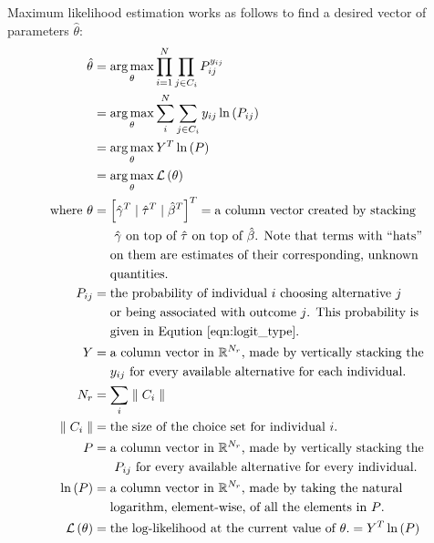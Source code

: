 \documentclass{article}
\DeclareMathOperator*{\argmax}{arg\,max} %
\begin{document}
Maximum likelihood estimation works as follows to find a desired vector of parameters $\hat{\theta}$:
\begin{equation}
\label{eqn:log_likelihood}
\begin{aligned}
\hat{\theta} &= \argmax_{\theta} \prod _{i = 1} ^N \prod _{j \in C_i} P_{ij} ^{y_{ij}} \\
&= \argmax_{\theta} \sum _i ^N \sum _{j \in C_i} y_{ij} \ln \left( P_{ij} \right) \\
&= \argmax_{\theta} Y^T \ln \left( P \right) \\
&= \argmax_{\theta} \mathcal{L} \left( \theta \right) \\
\textrm{where } \theta &= \left[ \hat{\gamma} ^T \mid \hat{\tau} ^T \mid \hat{\beta} ^T \right]^T = \textrm{a column vector created by stacking}\\
&\quad \ \textrm{ $\hat{\gamma}$ on top of $\hat{\tau}$ on top of $\hat{\beta}$. Note that terms with ``hats''} \\
&\quad \ \textrm{on them are estimates of their corresponding, unknown} \\
&\quad \ \textrm{quantities.} \\
P_{ij} &= \textrm{the probability of individual $i$ choosing alternative $j$} \\
&\quad \ \textrm{or being associated with outcome $j$. This probability is}\\
&\quad \ \textrm{given in Eqution \ref{eqn:logit_type}.}\\
Y &= \textrm{a column vector in $\mathbb{R}^{N_r}$, made by vertically stacking the} \\
&\quad \ \textrm{$y_{ij}$ for every available alternative for each individual.}\\
N_r &= \sum _i \parallel C_i \parallel \\
\parallel C_i \parallel &= \textrm{the size of the choice set for individual $i$.}\\
P &= \textrm{a column vector in $\mathbb{R}^{N_r}$, made by vertically stacking the} \\
&\quad \ \textrm{ $P_{ij}$ for every available alternative for every individual.}\\
\ln \left( P \right) &= \textrm{a column vector in $\mathbb{R}^{N_r}$, made by taking the natural} \\
&\quad \ \textrm{logarithm, element-wise, of all the elements in  $P$.}\\
\mathcal{L} \left( \theta \right) &= \textrm{the log-likelihood at the current value of $\theta$.} = Y^T \ln \left( P \right)
\end{aligned}
\end{equation}
\end{document}
